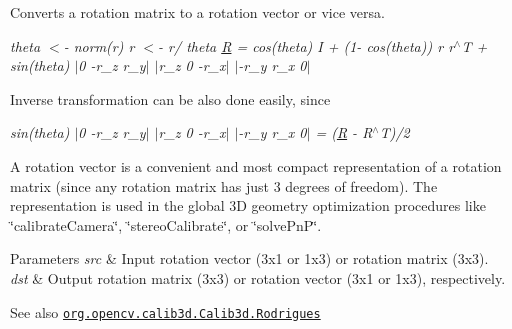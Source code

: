 Converts a rotation matrix to a rotation vector or vice versa.

{\itshape theta $<$-\/ norm(r) r $<$-\/ r/ theta \mbox{\hyperlink{classorg_1_1opencv_1_1_r}{R}} = cos(theta) I + (1-\/ cos(theta)) r r$^\wedge$T + sin(theta) $\vert$0 -\/r\+\_\+z r\+\_\+y$\vert$ $\vert$r\+\_\+z 0 -\/r\+\_\+x$\vert$ $\vert$-\/r\+\_\+y r\+\_\+x 0$\vert$ }

Inverse transformation can be also done easily, since

{\itshape sin(theta) $\vert$0 -\/r\+\_\+z r\+\_\+y$\vert$ $\vert$r\+\_\+z 0 -\/r\+\_\+x$\vert$ $\vert$-\/r\+\_\+y r\+\_\+x 0$\vert$ = (\mbox{\hyperlink{classorg_1_1opencv_1_1_r}{R}} -\/ R$^\wedge$T)/2}

A rotation vector is a convenient and most compact representation of a rotation matrix (since any rotation matrix has just 3 degrees of freedom). The representation is used in the global 3D geometry optimization procedures like \char`\"{}calibrate\+Camera\char`\"{}, \char`\"{}stereo\+Calibrate\char`\"{}, or \char`\"{}solve\+Pn\+P\char`\"{}.


\begin{DoxyParams}{Parameters}
{\em src} & Input rotation vector (3x1 or 1x3) or rotation matrix (3x3). \\
\hline
{\em dst} & Output rotation matrix (3x3) or rotation vector (3x1 or 1x3), respectively.\\
\hline
\end{DoxyParams}
\begin{DoxySeeAlso}{See also}
\href{http://docs.opencv.org/modules/calib3d/doc/camera_calibration_and_3d_reconstruction.html#rodrigues}{\tt org.\+opencv.\+calib3d.\+Calib3d.\+Rodrigues} 
\end{DoxySeeAlso}
\mbox{\label{classorg_1_1opencv_1_1calib3d_1_1_calib3d_a25a9a7350da241cac233a16419ad3ebd}} 
